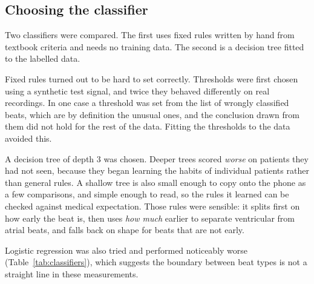 \documentclass[conference]{IEEEtran}
\begin{document}
\subsection{Choosing the classifier}

Two classifiers were compared. The first uses fixed rules written by hand from
textbook criteria and needs no training data. The second is a decision tree
fitted to the labelled data.

Fixed rules turned out to be hard to set correctly. Thresholds were first chosen
using a synthetic test signal, and twice they behaved differently on real
recordings. In one case a threshold was set from the list of wrongly classified
beats, which are by definition the unusual ones, and the conclusion drawn from
them did not hold for the rest of the data. Fitting the thresholds to the data
avoided this.

A decision tree of depth 3 was chosen. Deeper trees scored \emph{worse} on
patients they had not seen, because they began learning the habits of individual
patients rather than general rules. A shallow tree is also small enough to copy
onto the phone as a few comparisons, and simple enough to read, so the rules it
learned can be checked against medical expectation. Those rules were sensible: it
splits first on how early the beat is, then uses \emph{how much} earlier to
separate ventricular from atrial beats, and falls back on shape for beats that
are not early.

Logistic regression was also tried and performed noticeably worse
(Table~\ref{tab:classifiers}), which suggests the boundary between beat types is
not a straight line in these measurements.
\end{document}
